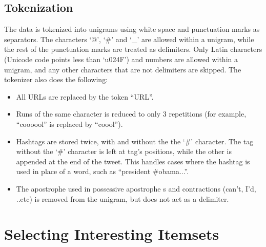 \documentclass[letterpaper,12pt,titlepage,oneside,final]{book}
\begin{document}
\section{Tokenization}
The data is tokenized into unigrams using white space and punctuation marks as separators. 
The characters `@', `\#' and `\_' are allowed within a unigram, 
while the rest of the punctuation marks are treated as delimiters. %
Only Latin characters  (Unicode code points less than `u024F') and numbers are allowed within a unigram,
and any other characters that are not delimiters are skipped.
The tokenizer also does the following:
\begin{itemize}
\item All URLs are replaced by the token ``URL''. 
\item Runs of the same character is reduced to only 3 repetitions (for example, ``coooool'' is replaced by  ``coool''). 
\item Hashtags are stored twice, with and without the the `\#' character. 
The tag without the `\#' character is left at tag's positions, while the other is appended at the end of the tweet.
This handles cases where the hashtag is used in place of a word, such as ``president \#obama...''.
 \item The apostrophe used in possessive apostrophe s and contractions (can't, I'd, ..etc) is removed from the unigram, but does not act as a delimiter.
\end{itemize}




\chapter{Selecting Interesting Itemsets}
\label{sec:strong}
\end{document}
